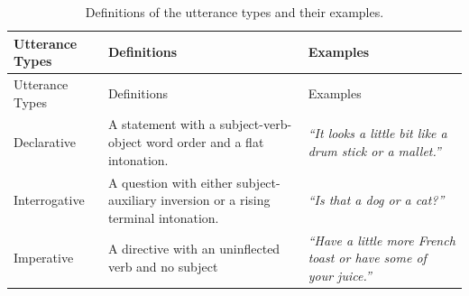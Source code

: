 \documentclass[,man,floatsintext]{apa6}
\begin{document}
\begin{longtable}[]{@{}lll@{}}
\caption{\label{tab:utteranceTypes} Definitions of the utterance types and their examples.}\tabularnewline
\toprule
\begin{minipage}[b]{0.18\columnwidth}\raggedright
Utterance Types\strut
\end{minipage} & \begin{minipage}[b]{0.42\columnwidth}\raggedright
Definitions\strut
\end{minipage} & \begin{minipage}[b]{0.32\columnwidth}\raggedright
Examples\strut
\end{minipage}\tabularnewline
\midrule
\endfirsthead
\toprule
\begin{minipage}[b]{0.18\columnwidth}\raggedright
Utterance Types\strut
\end{minipage} & \begin{minipage}[b]{0.42\columnwidth}\raggedright
Definitions\strut
\end{minipage} & \begin{minipage}[b]{0.32\columnwidth}\raggedright
Examples\strut
\end{minipage}\tabularnewline
\midrule
\endhead
\begin{minipage}[t]{0.18\columnwidth}\raggedright
Declarative\strut
\end{minipage} & \begin{minipage}[t]{0.42\columnwidth}\raggedright
A statement with a subject-verb-object word order and a flat intonation.\strut
\end{minipage} & \begin{minipage}[t]{0.32\columnwidth}\raggedright
\emph{\enquote{It looks a little bit like a drum stick or a mallet.}}\strut
\end{minipage}\tabularnewline
\begin{minipage}[t]{0.18\columnwidth}\raggedright
Interrogative\strut
\end{minipage} & \begin{minipage}[t]{0.42\columnwidth}\raggedright
A question with either subject-auxiliary inversion or a rising terminal intonation.\strut
\end{minipage} & \begin{minipage}[t]{0.32\columnwidth}\raggedright
\emph{\enquote{Is that a dog or a cat?}}\strut
\end{minipage}\tabularnewline
\begin{minipage}[t]{0.18\columnwidth}\raggedright
Imperative\strut
\end{minipage} & \begin{minipage}[t]{0.42\columnwidth}\raggedright
A directive with an uninflected verb and no subject\strut
\end{minipage} & \begin{minipage}[t]{0.32\columnwidth}\raggedright
\emph{\enquote{Have a little more French toast or have some of your juice.}}\strut
\end{minipage}\tabularnewline
\bottomrule
\end{longtable}
\end{document}

